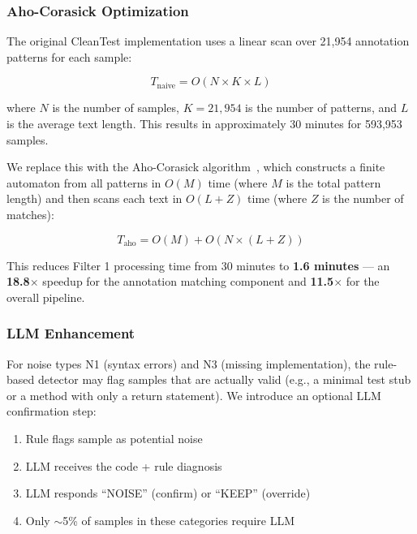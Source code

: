 \documentclass[acmlarge,nonacm,screen]{acmart}
\begin{document}
\subsubsection{Aho-Corasick Optimization}

The original CleanTest implementation uses a linear scan over 21,954 annotation patterns for each sample:

\begin{equation}
T_{\text{naive}} = O(N \times K \times L)
\end{equation}

where $N$ is the number of samples, $K = 21{,}954$ is the number of patterns, and $L$ is the average text length. This results in approximately 30 minutes for 593,953 samples.

We replace this with the Aho-Corasick algorithm~\cite{aho1975efficient}, which constructs a finite automaton from all patterns in $O(M)$ time (where $M$ is the total pattern length) and then scans each text in $O(L + Z)$ time (where $Z$ is the number of matches):

\begin{equation}
T_{\text{aho}} = O(M) + O(N \times (L + Z))
\end{equation}

This reduces Filter 1 processing time from 30 minutes to \textbf{1.6 minutes} --- an \textbf{18.8$\times$} speedup for the annotation matching component and \textbf{11.5$\times$} for the overall pipeline.

\subsubsection{LLM Enhancement}

For noise types N1 (syntax errors) and N3 (missing implementation), the rule-based detector may flag samples that are actually valid (e.g., a minimal test stub or a method with only a return statement). We introduce an optional LLM confirmation step:

\begin{enumerate}
    \item Rule flags sample as potential noise
    \item LLM receives the code + rule diagnosis
    \item LLM responds ``NOISE'' (confirm) or ``KEEP'' (override)
    \item Only $\sim$5\% of samples in these categories require LLM
\end{enumerate}
\end{document}
